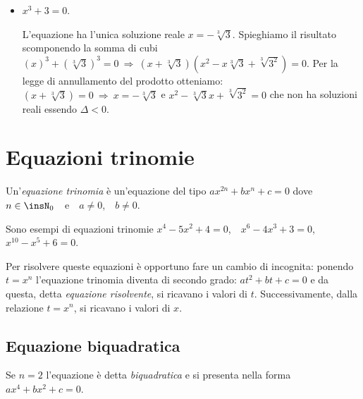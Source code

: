 \begin{exrig}
\begin{esempio}
\begin{itemize}
\item $x^3+3=0$.

L'equazione ha l'unica soluzione reale $x=-\sqrt[3]3$. Spieghiamo il risultato scomponendo la somma di cubi $\left(x\right)^3+\left(\sqrt[3]3\right)^3=0 \:\Rightarrow\: \left(x+\sqrt[3]3\right) \left(x^2-x\sqrt[3]3+\sqrt[3]{3^2}\right)=0$. Per la legge di annullamento del prodotto otteniamo: $\left(x+\sqrt[3]3\right)=0 \:\Rightarrow\: x=-\sqrt[3] 3$ e $x^2-\sqrt[3]3 x+\sqrt[3]{3^2}=0$ che non ha soluzioni reali essendo $\Delta <0$.
\end{itemize}
 \end{esempio}
\end{exrig}

\ovalbox{\risolvii \ref{ese:5.12}, \ref{ese:5.13}, \ref{ese:5.14}, \ref{ese:5.15}, \ref{ese:5.16}, \ref{ese:5.17}, \ref{ese:5.18}, \ref{ese:5.19}, \ref{ese:5.20}}

\section{Equazioni trinomie}

\begin{definizione}
Un'\emph{equazione trinomia} è un'equazione del tipo $ax^{2n}+bx^n+c=0$ dove $n \in \insN_0$~~e~~$a\neq 0$,~~$b\neq 0$.
\end{definizione}

Sono esempi di equazioni trinomie $x^4-5x^2+4=0$,\ \  $x^6-4x^3+3=0$,\ \ $x^{10}-x^5+6=0$.

Per risolvere queste equazioni è opportuno fare un cambio di incognita: ponendo $t=x^n$ l'equazione trinomia diventa di secondo grado: $at^2+bt+c=0$ e da questa, detta \emph{equazione risolvente}, si ricavano i valori di $t$. Successivamente, dalla relazione $t=x^n$, si ricavano i valori di $x$.

\subsection{Equazione biquadratica}

Se $n=2$ l'equazione è detta \emph{biquadratica} e si presenta nella forma~~$ax^4+bx^2+c=0$.


